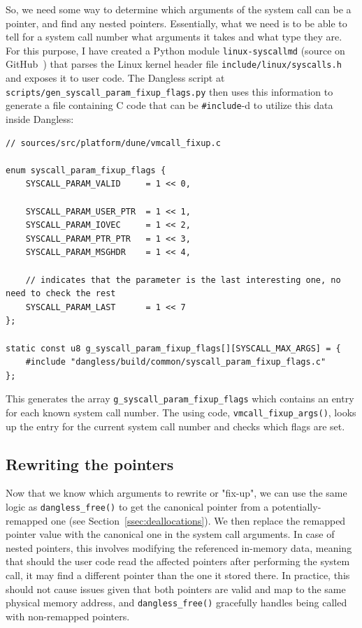So, we need some way to determine which arguments of the system call can be a pointer, and find any nested pointers. Essentially, what we need is to be able to tell for a system call number what arguments it takes and what type they are. For this purpose, I have created a Python module \texttt{linux-syscallmd} (source on GitHub~\cite{github-linux-syscallmd}) that parses the Linux kernel header file \texttt{include/linux/syscalls.h} and exposes it to user code. The Dangless script at \texttt{scripts/gen\_syscall\_param\_fixup\_flags.py} then uses this information to generate a file containing C code that can be \lstinline!#include!-d to utilize this data inside Dangless:

\begin{lstlisting}
// sources/src/platform/dune/vmcall_fixup.c

enum syscall_param_fixup_flags {
	SYSCALL_PARAM_VALID     = 1 << 0,
	
	SYSCALL_PARAM_USER_PTR  = 1 << 1,
	SYSCALL_PARAM_IOVEC     = 1 << 2,
	SYSCALL_PARAM_PTR_PTR   = 1 << 3,
	SYSCALL_PARAM_MSGHDR    = 1 << 4,
	
	// indicates that the parameter is the last interesting one, no need to check the rest
	SYSCALL_PARAM_LAST      = 1 << 7
};

static const u8 g_syscall_param_fixup_flags[][SYSCALL_MAX_ARGS] = {
	#include "dangless/build/common/syscall_param_fixup_flags.c"
};
\end{lstlisting}

This generates the array \lstinline!g_syscall_param_fixup_flags! which contains an entry for each known system call number. The using code, \lstinline!vmcall_fixup_args()!, looks up the entry for the current system call number and checks which flags are set. 

\subsection{Rewriting the pointers}

Now that we know which arguments to rewrite or "fix-up", we can use the same logic as \lstinline!dangless_free()! to get the canonical pointer from a potentially-remapped one (see Section~\ref{ssec:deallocations}). We then replace the remapped pointer value with the canonical one in the system call arguments.
In case of nested pointers, this involves modifying the referenced in-memory data, meaning that should the user code read the affected pointers after performing the system call, it may find a different pointer than the one it stored there. In practice, this should not cause issues given that both pointers are valid and map to the same physical memory address, and \lstinline!dangless_free()! gracefully handles being called with non-remapped pointers.

